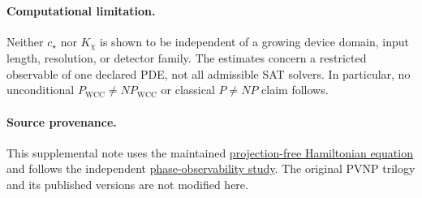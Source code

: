 \documentclass[11pt]{article}
\begin{document}
\paragraph{Computational limitation.}
Neither \(c_\star\) nor \(K_\chi\) is shown to be independent of a
growing device domain, input length, resolution, or detector family.
The estimates concern a restricted observable of one declared PDE,
not all admissible SAT solvers. In particular, no unconditional
\(P_{\mathrm{WCC}}\ne NP_{\mathrm{WCC}}\) or classical \(P\ne NP\)
claim follows.

\paragraph{Source provenance.}
This supplemental note uses the maintained
\href{https://github.com/rickyjreyes/wct-pde/blob/main/src/wct_pde/projection_free.py}
{projection-free Hamiltonian equation} and follows the independent
\href{https://github.com/rickyjreyes/PVNP/blob/main/pvnp/proofs/phase-sensitive-observability.md}
{phase-observability study}. The original PVNP trilogy and its
published versions are not modified here.
\end{document}
